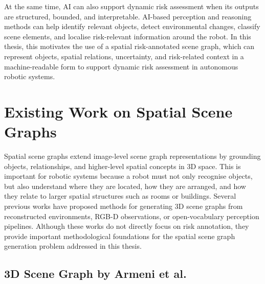 {At the same time, AI can also support dynamic risk assessment when its outputs are structured, bounded, and interpretable. AI-based perception and reasoning methods can help identify relevant objects, detect environmental changes, classify scene elements, and localise risk-relevant information around the robot. In this thesis, this motivates the use of a spatial risk-annotated scene graph, which can represent objects, spatial relations, uncertainty, and risk-related context in a machine-readable form to support dynamic risk assessment in autonomous robotic systems.

}












\section{Existing Work on Spatial Scene Graphs}

{\small

Spatial scene graphs extend image-level scene graph representations by grounding objects, relationships, and higher-level spatial concepts in 3D space. This is important for robotic systems because a robot must not only recognise objects, but also understand where they are located, how they are arranged, and how they relate to larger spatial structures such as rooms or buildings. Several previous works have proposed methods for generating 3D scene graphs from reconstructed environments, RGB-D observations, or open-vocabulary perception pipelines. Although these works do not directly focus on risk annotation, they provide important methodological foundations for the spatial scene graph generation problem addressed in this thesis.

}

\subsection{3D Scene Graph by Armeni et al.}

